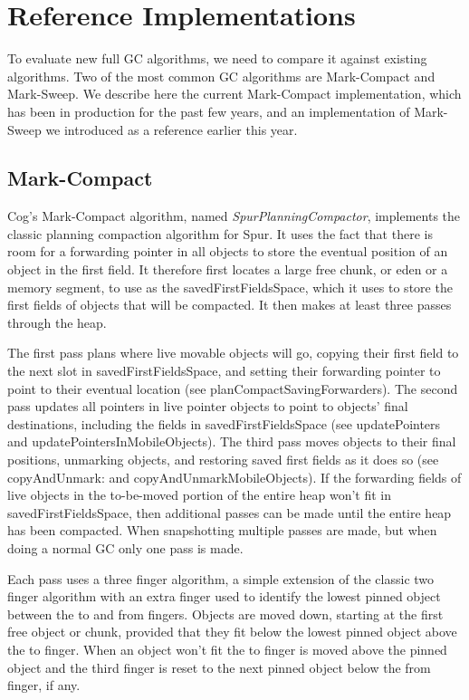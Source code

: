 \documentclass[10pt, sigplan]{acmart}
\begin{document}
\section{Reference Implementations}
\label{sec:ref}

To evaluate new full GC algorithms, we need to compare it against existing algorithms. Two of the most common GC algorithms are Mark-Compact and Mark-Sweep. We describe here the current Mark-Compact implementation, which has been in production for the past few years, and an implementation of Mark-Sweep we introduced as a reference earlier this year. 

\subsection{Mark-Compact}

Cog's Mark-Compact algorithm, named \emph{SpurPlanningCompactor}, implements the classic planning compaction algorithm for Spur.  It uses the fact that there is room for a forwarding pointer in all objects to store the eventual position of an object in the first field. It therefore first locates a large free chunk, or eden or a memory segment, to use as the savedFirstFieldsSpace, which it uses to store the first fields of objects that will be compacted. It then makes at least three passes through the heap.

The first pass plans where live movable objects will go, copying their first field to the next slot in savedFirstFieldsSpace, and setting their forwarding pointer to point to their eventual location (see planCompactSavingForwarders). The second pass updates all pointers in live pointer objects to point to objects' final destinations, including the fields in savedFirstFieldsSpace (see updatePointers and updatePointersInMobileObjects). The third pass moves objects to their final positions, unmarking objects, and restoring saved first fields as it does so (see copyAndUnmark: and copyAndUnmarkMobileObjects). If the forwarding fields of live objects in the to-be-moved portion of the entire heap won't fit in savedFirstFieldsSpace, then additional passes can be made until the entire heap has been compacted.  When snapshotting multiple passes are made, but when doing a normal GC only one pass is made.

Each pass uses a three finger algorithm, a simple extension of the classic two finger algorithm with an extra finger used to identify the lowest pinned object between the to and from fingers.  Objects are moved down, starting at the first free object or chunk, provided that they fit below the lowest pinned object above the to finger.  When an object won't fit the to finger is moved above the pinned object and the third finger is reset to the next pinned object below the from finger, if any.
\end{document}
